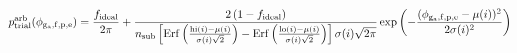 \documentclass[12pt]{article}
\begin{document}
\begin{displaymath}
p_{\rm trial}^{\rm arb}(\phi_{\rm g_a,f,p,e}) = 
{{f_{\rm ideal}}\over{2 \pi}} +
{
{2 \left(1 - f_{\rm ideal}\right)}
\over
{
n_{\rm sub}
\left[
{\rm Erf}\left({{{\rm hi}(i)-\mu(i)}\over{\sigma(i) \sqrt{2}}}\right)
- {\rm Erf}\left({{{\rm lo}(i)-\mu(i)}\over{\sigma(i) \sqrt{2}}}\right)
\right]
\sigma(i) \sqrt{2 \pi}
}
}
\exp\left(-{{(\phi_{\rm g_a,f,p,e} - \mu(i))^2}\over{2 \sigma(i)^2}}\right)
\end{displaymath}
\end{document}
